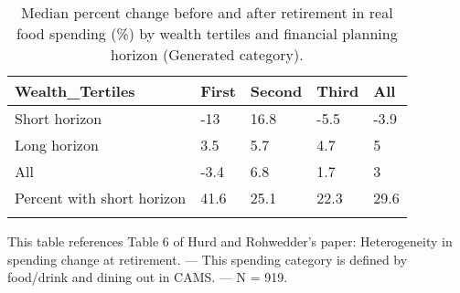 \begin{table}[tbp] \centering
{}

\caption{Median percent change before and after retirement in real food spending (\%) by wealth tertiles and financial planning horizon (Generated category).}
\begin{tabularx}{\textwidth}{lCCCC}

\toprule
{Wealth\_Tertiles}&{First}&{Second}&{Third}&{All} \tabularnewline
\midrule\addlinespace[1.5ex]
Short horizon&-13&16.8&-5.5&-3.9 \tabularnewline
Long horizon&3.5&5.7&4.7&5 \tabularnewline
All&-3.4&6.8&1.7&3 \tabularnewline
Percent with short horizon&41.6&25.1&22.3&29.6 \tabularnewline
\bottomrule \addlinespace[1.5ex]

\end{tabularx}
\begin{flushleft}
\footnotesize This table references Table 6 of Hurd and Rohwedder's paper: Heterogeneity in spending change at retirement. \linebreak --- \linebreak This spending category is defined by food/drink and dining out in CAMS. \linebreak --- \linebreak N = 919.
\end{flushleft}
\end{table}
